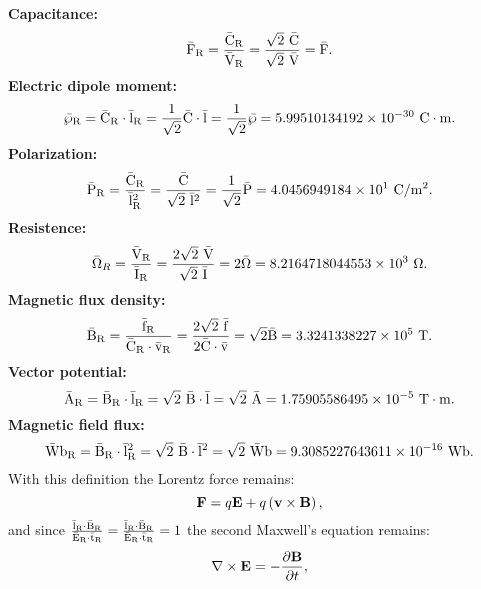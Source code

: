 \documentclass[12pt,a4paper,twoside]{report}
\def\bardipry{5.99510134192\times 10^{-30}}
\def\barpolarry{4.0456949184\times 10^{1}}
\def\barohmry{8.2164718044553\times 10^{3}}
\def\barbry{3.3241338227\times 10^{5}}
\def\baravry{1.75905586495\times 10^{-5}}
\def\barwbry{9.3085227643611\times 10^{-16}}
\begin{document}
{{\begin{equation}
\end{equation}
{\bf Capacitance:}
\begin{equation}
{\rm \bar F_R}={{\rm \bar C_R} \over {\rm \bar V_R}}= {\sqrt{2}\ {\rm \bar C} \over \sqrt{2}\ {\rm \bar V}}
= {\rm \bar F}.
\end{equation}
{\bf Electric dipole moment:}
\begin{equation}
{\rm \bar \wp_R}={{\rm \bar C_R} \cdot {\rm \bar l_R}}= {1\over \sqrt{2}} {\rm \bar C} \cdot {\rm \bar l} 
= {1\over \sqrt{2}} {\rm \bar \wp}=\bardipry\ {\rm C}\cdot {\rm m}.
\end{equation}
{\bf Polarization:}
\begin{equation}
{\rm \bar P_R}={{\rm \bar C_R} \over {\rm \bar l_R}^2}= {{\rm \bar C} \over \sqrt{2}\ {\rm \bar l}^2}
= {1\over \sqrt{2}} {\rm \bar P}=\barpolarry\ {\rm C}/{\rm m}^2.
\end{equation}
{\bf Resistence:}
\begin{equation}
\bar \Omega_R={{\rm \bar V_R} \over {\rm \bar I_R}}= {2 \sqrt{2}\ {\rm \bar V} \over \sqrt{2}\  
{\rm \bar I}}
= 2 \bar \Omega=\barohmry\ \Omega.
\end{equation}
{\bf Magnetic flux density:}
\begin{equation}
{\rm \bar B_R}={{\rm \bar f_R} \over {\rm \bar C_R} \cdot {\rm \bar v_R}}= {2 \sqrt{2}\ {\rm \bar f} \over 2 
{\rm \bar C}\cdot {\rm \bar v}}
= \sqrt{2} {\rm \bar B}=\barbry\ {\rm T}.
\end{equation}
{\bf Vector potential:}
\begin{equation}
{\rm \bar A_R}={{\rm \bar B_R}\cdot {\rm \bar l_R} }= \sqrt{2}\ {\rm \bar B}
\cdot {\rm \bar l} 
= \sqrt{2}\ {\rm \bar A}=\baravry\  {\rm T}\cdot {\rm m}.
\end{equation}
{\bf Magnetic field flux:}
\begin{equation}
{\rm \bar Wb_R}={{\rm \bar B_R} \cdot {\rm \bar l_R}^2 }= \sqrt{2}\ {\rm \bar B} \cdot {\rm \bar l}^2
= \sqrt{2}\ {\rm \bar Wb}=\barwbry\ {\rm Wb}.
\end{equation}
With this definition the Lorentz force remains:
\begin{equation}
{\bf F}=q {\bf E} + q \left({\bf v}\times {\bf B}\right),
\end{equation}
and since ${{\rm \bar l_R}\cdot {\rm \bar B_R} \over {\rm \bar E_R}\cdot {\rm \bar t_R}}={{\rm \bar l_R}\cdot {\rm \bar B_R} \over {\rm \bar E_R}\cdot {\rm \bar t_R}}=1$ the second Maxwell's equation remains:
\begin{equation}
\nabla\times {\bf E}=-{\partial {\bf B}\over \partial t},

\end{equation}}}
\end{document}

